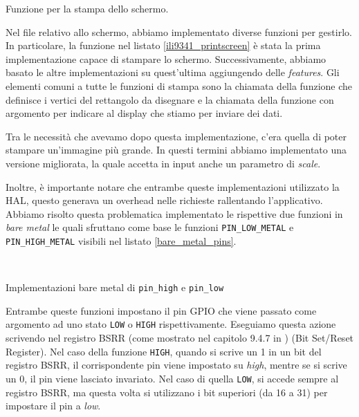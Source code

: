 \documentclass[a4paper]{article}
\begin{document}
\begin{Listing}[h!t] %
    \centering
    \caption{Funzione per la stampa dello schermo.}
    \label{ili9341_printscreen}
\end{Listing}

Nel file relativo allo schermo, abbiamo implementato diverse funzioni per gestirlo.
In particolare, la funzione nel listato \ref{ili9341_printscreen} è stata la prima
implementazione capace di stampare lo schermo. Successivamente, abbiamo basato le altre
implementazioni su quest'ultima aggiungendo delle \textit{features}.
Gli elementi comuni a tutte le funzioni di stampa sono la chiamata della funzione
{} che definisce i vertici
del rettangolo da disegnare e la chiamata della funzione  con argomento
{} per indicare al display
che stiamo per inviare dei dati.

Tra le necessità che avevamo dopo questa implementazione, c'era quella di poter stampare
un'immagine più grande. In questi termini abbiamo implementato una versione migliorata,
la quale accetta in input anche un parametro di \textit{scale}.

Inoltre, è importante notare che entrambe queste implementazioni utilizzato la HAL, questo
generava un overhead nelle richieste rallentando l'applicativo. Abbiamo risolto questa
problematica implementato le rispettive due funzioni in \textit{bare metal} le quali
sfruttano come base le funzioni \texttt{PIN\_LOW\_METAL} e \texttt{PIN\_HIGH\_METAL}
visibili nel listato \ref{bare_metal_pins}.

\begin{Listing}
    \centering
    \mbox{
        \quad
    }
    \caption{Implementazioni bare metal di \texttt{pin\_high} e \texttt{pin\_low}}
    \label{bare_metal_pins}
\end{Listing}

Entrambe queste funzioni impostano il pin GPIO che viene passato come argomento ad
uno stato \texttt{LOW} o \texttt{HIGH} rispettivamente.  Eseguiamo questa azione scrivendo
nel registro BSRR (come mostrato nel capitolo 9.4.7 in \cite{STM32F334xx}) (Bit Set/Reset Register).
Nel caso della funzione \texttt{HIGH}, quando si scrive un 1 in un bit del registro BSRR,
il corrispondente pin viene impostato su \textit{high}, mentre se si scrive un 0, il pin viene
lasciato invariato. Nel caso di quella \texttt{LOW}, si accede sempre al registro BSRR,
ma questa volta si utilizzano i bit superiori (da 16 a 31) per impostare il pin a \textit{low}.
\end{document}
